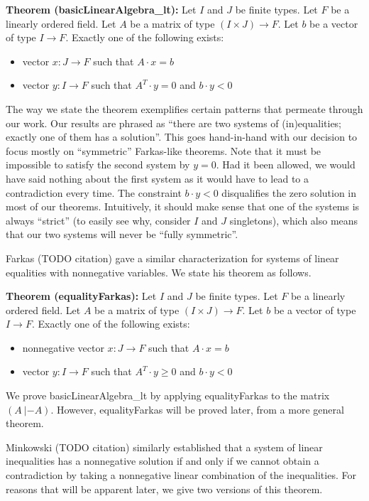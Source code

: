 \documentclass[]{article}
\renewcommand{\.}{\hskip .75pt}
\let\r=\rightarrow
\let\*=\cdot
\begin{document}
\medskip \noindent
\textbf{Theorem (basicLinearAlgebra\_lt):}
Let $I$ and $J$ be finite types.
Let $F$ be a linearly ordered field.
Let $A$ be a matrix of type $(I \times J) \r F$.
Let $b$ be a vector of type $I \r F$.
Exactly one of the following exists:
\begin{itemize}
\item vector $x : J \r F$ such that $A \* x = b$
\item vector $y : I \r F$ such that $A^T\! \* y = 0$ and $b \* y < 0$
\end{itemize}
The way we state the theorem exemplifies certain patterns that
permeate through our work. Our results are phrased as
``there are two systems of (in)equalities; exactly one of them has a solution''.
This goes hand-in-hand with our decision to focus mostly on ``symmetric'' Farkas-like theorems.
Note that it must be impossible to satisfy the second system by $y=0$.
Had it been allowed, we would have said nothing about the first system as it would
have to lead to a contradiction every time. The constraint $b \* y < 0$ disqualifies
the zero solution in most of our theorems. Intuitively, it should make sense that
one of the systems is always ``strict'' (to easily see why, consider $I$ and $J$ singletons),
which also means that our two systems will never be ``fully symmetric''.

Farkas (TODO citation) gave a similar characterization for systems of linear equalities
with nonnegative variables.
We state his theorem as follows.

\medskip \noindent
\textbf{Theorem (equalityFarkas):}
Let $I$ and $J$ be finite types.
Let $F$ be a linearly ordered field.
Let $A$ be a matrix of type $(I \times J) \r F$.
Let $b$ be a vector of type $I \r F$.
Exactly one of the following exists:
\begin{itemize}
\item nonnegative vector $x : J \r F$ such that $A \* x = b$
\item vector $y : I \r F$ such that $A^T\! \* y \ge 0$ and $b \* y < 0$
\end{itemize}
We prove basicLinearAlgebra\_lt by applying equalityFarkas to the matrix $(A~|-\!\! A)$.
However, equalityFarkas will be proved later, from a more general theorem.

Minkowski (TODO citation) similarly established that
a system of linear inequalities has a nonnegative solution if and only if
we cannot obtain a contradiction by taking a nonnegative linear combination of the inequalities.
For reasons that will be apparent later, we give two versions of this theorem.
\end{document}
